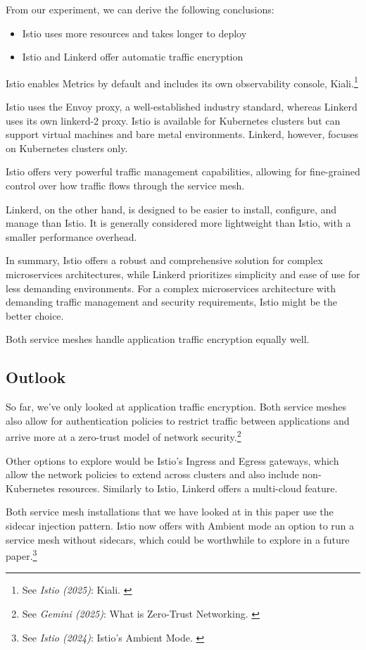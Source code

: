 From our experiment, we can derive the following conclusions:

\begin{itemize}
    \item Istio uses more resources and takes longer to deploy
    \item Istio and Linkerd offer automatic traffic encryption
\end{itemize}

Istio enables Metrics by default and includes its own observability console, Kiali.\footnote{See \textit{Istio (2025)}: Kiali. \cite{istioKiali}}

Istio uses the Envoy proxy, a well-established industry standard, whereas Linkerd uses its own linkerd-2 proxy. Istio is available for Kubernetes clusters but can support virtual machines and bare metal environments. Linkerd, however, focuses on Kubernetes clusters only.

Istio offers very powerful traffic management capabilities, allowing for fine-grained control over how traffic flows through the service mesh.

Linkerd, on the other hand, is designed to be easier to install, configure, and manage than Istio. It is generally considered more lightweight than Istio, with a smaller performance overhead.

In summary, Istio offers a robust and comprehensive solution for complex microservices architectures, while Linkerd prioritizes simplicity and ease of use for less demanding environments. For a complex microservices architecture with demanding traffic management and security requirements, Istio might be the better choice.

Both service meshes handle application traffic encryption equally well.

\subsection{Outlook}

So far, we've only looked at application traffic encryption. Both service meshes also allow for authentication policies to restrict traffic between applications and arrive more at a zero-trust model of network security.\footnote{See \textit{Gemini (2025)}: What is Zero-Trust Networking. \cite{bardZeroTrust}} 

Other options to explore would be Istio's Ingress and Egress gateways, which allow the network policies to extend across clusters and also include non-Kubernetes resources. Similarly to Istio, Linkerd offers a multi-cloud feature.

Both service mesh installations that we have looked at in this paper use the sidecar injection pattern. Istio now offers with Ambient mode an option to run a service mesh without sidecars, which could be worthwhile to explore in a future paper.\footnote{See \textit{Istio (2024)}: Istio's Ambient Mode. \cite{istioAmbient}}
